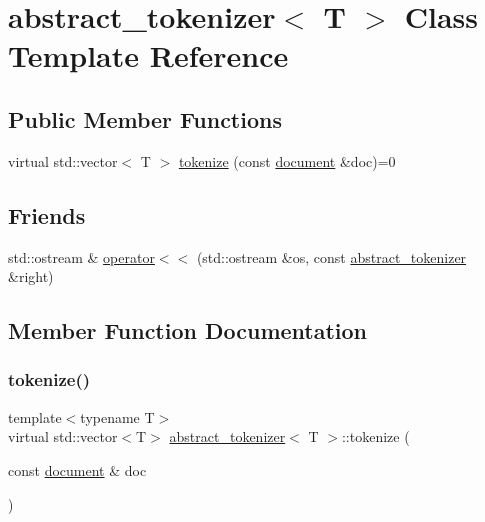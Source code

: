 \hypertarget{classabstract__tokenizer}{}\section{abstract\+\_\+tokenizer$<$ T $>$ Class Template Reference}
\label{classabstract__tokenizer}
\subsection*{Public Member Functions}
\begin{DoxyCompactItemize}
\item 
virtual std\+::vector$<$ T $>$ \hyperlink{classabstract__tokenizer_aeea4a861fdfa18351555b0d00a378165}{tokenize} (const \hyperlink{classdocument}{document} \&doc)=0
\end{DoxyCompactItemize}
\subsection*{Friends}
\begin{DoxyCompactItemize}
\item 
std\+::ostream \& \hyperlink{classabstract__tokenizer_abca989b4c879ea066af32a6aa0c84376}{operator$<$$<$} (std\+::ostream \&os, const \hyperlink{classabstract__tokenizer}{abstract\+\_\+tokenizer} \&right)
\end{DoxyCompactItemize}


\subsection{Member Function Documentation}
\mbox{\label{classabstract__tokenizer_aeea4a861fdfa18351555b0d00a378165}} 
\subsubsection{\texorpdfstring{tokenize()}{tokenize()}}
{\footnotesize\ttfamily template$<$typename T$>$ \\
virtual std\+::vector$<$T$>$ \hyperlink{classabstract__tokenizer}{abstract\+\_\+tokenizer}$<$ T $>$\+::tokenize (\begin{DoxyParamCaption}\item[{const \hyperlink{classdocument}{document} \&}]{doc }\end{DoxyParamCaption})\hspace{0.3cm}{\ttfamily [pure virtual]}}

